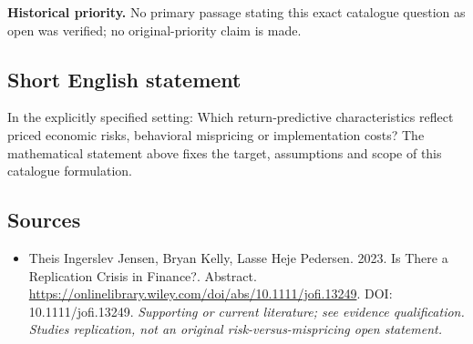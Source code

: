 \documentclass[11pt]{article}
\begin{document}
\par\textbf{Historical priority.} No primary passage stating this exact catalogue question as open was verified; no original-priority claim is made.

\subsection{Short English statement}
In the explicitly specified setting: Which return-predictive characteristics reflect priced economic risks, behavioral mispricing or implementation costs? The mathematical statement above fixes the target, assumptions and scope of this catalogue formulation.

\subsection{Sources}
\begin{itemize}\raggedright
\item[\textnormal{[S1]}]\hypertarget{source:30007596:1}{} Theis Ingerslev Jensen, Bryan Kelly, Lasse Heje Pedersen. 2023. Is There a Replication Crisis in Finance?. Abstract.
\url{https://onlinelibrary.wiley.com/doi/abs/10.1111/jofi.13249}.
DOI: 10.1111/jofi.13249.
{\small\textit{Supporting or current literature; see evidence qualification. Studies replication, not an original risk-versus-mispricing open statement.}}
\end{itemize}
\end{document}
